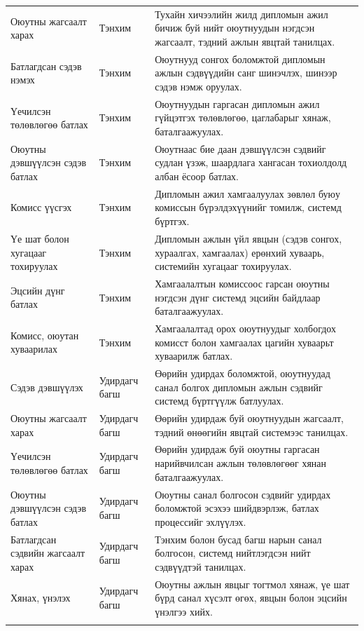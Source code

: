 \begin{longtable}{p{3 cm} p{2.5 cm} p{10.5 cm}}
\midrule
Оюутны жагсаалт харах & Тэнхим & Тухайн хичээлийн жилд дипломын ажил бичиж буй нийт оюутнуудын нэгдсэн жагсаалт, тэдний ажлын явцтай танилцах. \\ \addlinespace
Батлагдсан сэдэв нэмэх & Тэнхим & Оюутнууд сонгох боломжтой дипломын ажлын сэдвүүдийн санг шинэчлэх, шинээр сэдэв нэмж оруулах. \\ \addlinespace
Үечилсэн төлөвлөгөө батлах & Тэнхим & Оюутнуудын гаргасан дипломын ажил гүйцэтгэх төлөвлөгөө, цаглабарыг хянаж, баталгаажуулах. \\ \addlinespace
Оюутны дэвшүүлсэн сэдэв батлах & Тэнхим & Оюутнаас бие даан дэвшүүлсэн сэдвийг судлан үзэж, шаардлага хангасан тохиолдолд албан ёсоор батлах. \\ \addlinespace
Комисс үүсгэх & Тэнхим & Дипломын ажил хамгаалуулах зөвлөл буюу комиссын бүрэлдэхүүнийг томилж, системд бүртгэх. \\ \addlinespace
Үе шат болон хугацааг тохируулах & Тэнхим & Дипломын ажлын үйл явцын (сэдэв сонгох, хураалгах, хамгаалах) ерөнхий хуваарь, системийн хугацааг тохируулах. \\ \addlinespace
Эцсийн дүнг батлах & Тэнхим & Хамгаалалтын комиссоос гарсан оюутны нэгдсэн дүнг системд эцсийн байдлаар баталгаажуулах. \\ \addlinespace
Комисс, оюутан хуваарилах & Тэнхим & Хамгаалалтад орох оюутнуудыг холбогдох комисст болон хамгаалах цагийн хуваарьт хуваарилж батлах. \\ \addlinespace
\midrule
Сэдэв дэвшүүлэх & Удирдагч багш & Өөрийн удирдах боломжтой, оюутнуудад санал болгох дипломын ажлын сэдвийг системд бүртгүүлж батлуулах. \\ \addlinespace
Оюутны жагсаалт харах & Удирдагч багш & Өөрийн удирдаж буй оюутнуудын жагсаалт, тэдний өнөөгийн явцтай системээс танилцах. \\ \addlinespace
Үечилсэн төлөвлөгөө батлах & Удирдагч багш & Өөрийн удирдаж буй оюутны гаргасан нарийвчилсан ажлын төлөвлөгөөг хянан баталгаажуулах. \\ \addlinespace
Оюутны дэвшүүлсэн сэдэв батлах & Удирдагч багш & Оюутны санал болгосон сэдвийг удирдах боломжтой эсэхээ шийдвэрлэж, батлах процессийг эхлүүлэх. \\ \addlinespace
Батлагдсан сэдвийн жагсаалт харах & Удирдагч багш & Тэнхим болон бусад багш нарын санал болгосон, системд нийтлэгдсэн нийт сэдвүүдтэй танилцах. \\ \addlinespace
Хянах, үнэлэх & Удирдагч багш & Оюутны ажлын явцыг тогтмол хянаж, үе шат бүрд санал хүсэлт өгөх, явцын болон эцсийн үнэлгээ хийх. \\ \addlinespace

\end{longtable}
